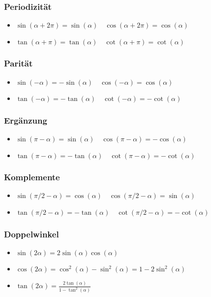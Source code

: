 \documentclass[8pt]{extarticle}
\begin{document}
\begin{multicols*}{3}
\subsubsection{Periodizität}
\begin{itemize}
 \item $\sin(\alpha + 2 \pi) = \sin(\alpha) \quad \cos(\alpha + 2 \pi) = \cos(\alpha)$
 \item $\tan(\alpha + \pi) = \tan(\alpha) \quad \cot(\alpha + \pi) = \cot(\alpha)$
\end{itemize}

\subsubsection{Parität}
\begin{itemize}
 \item $\sin(-\alpha) = - \sin(\alpha) \quad \cos(-\alpha) = \cos(\alpha)$
 \item $\tan(-\alpha) = - \tan(\alpha) \quad \cot(-\alpha) = - \cot(\alpha)$
\end{itemize}

\subsubsection{Ergänzung}
\begin{itemize}
 \item $\sin(\pi - \alpha) = \sin(\alpha) \quad \cos(\pi - \alpha) = - \cos(\alpha)$
 \item $\tan(\pi - \alpha) = -\tan(\alpha) \quad \cot(\pi - \alpha) = - \cot(\alpha)$
\end{itemize}


\subsubsection{Komplemente}
\begin{itemize}
 \item $\sin(\pi/2 - \alpha) = \cos(\alpha) \quad \cos(\pi/2 - \alpha) = \sin(\alpha)$
 \item $\tan(\pi/2 - \alpha) = -\tan(\alpha) \quad \cot(\pi/2 - \alpha) = -\cot(\alpha)$
\end{itemize}

\subsubsection{Doppelwinkel}
\begin{itemize}
 \item $\sin(2\alpha) = 2 \sin(\alpha) \cos(\alpha)$
 \item $\cos(2\alpha) = \cos^2(\alpha) - \sin^2(\alpha) = 1 - 2 \sin^2(\alpha)$
 \item $\tan(2\alpha) = \frac{2\tan(\alpha)}{1 - \tan^2(\alpha)}$
\end{itemize}


\end{multicols*}
\end{document}
